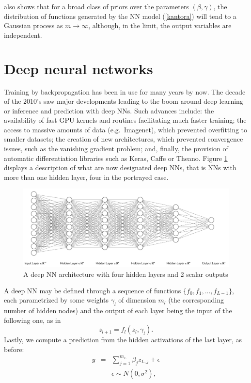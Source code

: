 \noindent
\cite{neal2012bayesian} also shows that
for a broad class of priors over the parameters 
$(\beta ,\gamma )$, the distribution of functions
generated by the NN model (\ref{kantora})
will tend to a Gaussian
process as  $m\rightarrow \infty$, although, in
the limit, the output variables are independent.

\section{Deep neural networks}

Training by backpropagation has been in use 
for many years by now.
The decade of the 2010's saw major developments
leading to 
the boom around deep learning \cite{deeplearningbook}
or inference and prediction with deep NNs. 
Such advances include:
the availability of fast GPU kernels and routines
facilitating much faster training;
the access to massive amounts of data (e.g.\ Imagenet), which prevented overfitting to smaller datasets; 
the creation of new architectures, which prevented  convergence issues, such as the vanishing gradient problem; 
and, finally, the provision of automatic differentiation libraries such as Keras, Caffe or Theano.
Figure \ref{figuradkk} displays a description
of what are now designated 
deep NNs, that is NNs with more than one hidden
layer, four in the portrayed case.
\begin{figure}
    \centering
    \includegraphics[scale=0.35]{figures/net2.png}
    \caption{A deep NN architecture with four hidden layers and 2 scalar outputs}
    \label{figuradkk}
\end{figure}


A deep NN may be defined through   
a sequence of functions $\lbrace f_0, f_1, ..., f_{L-1} \rbrace$, each parametrized by some weights $\gamma_l$
of dimension $m_l$  (the corresponding number of hidden nodes) and the output of each layer being the input of the following one, as in
$$
    z_{l+1} = f_l ( z_l, \gamma_l).
$$
Lastly, we compute a prediction from the hidden activations of the last layer, as before:
\begin{eqnarray}
y         & = & \sum_{j=1}^{m_L} \beta_j z_{L,j} +
                    \epsilon %
                    \nonumber\\
              & & \epsilon \sim N(0,\sigma^2),
                  \nonumber \\
\end{eqnarray}

